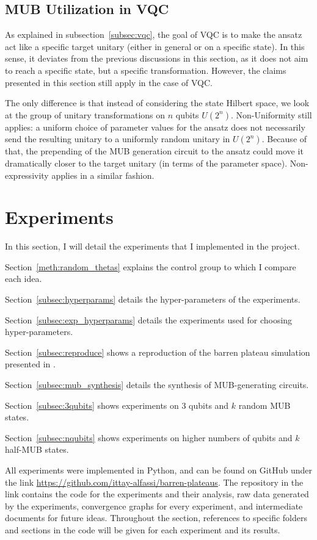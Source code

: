\documentclass[a4paper,12pt]{article}
\begin{document}
\subsection{MUB Utilization in VQC} \label{subsec:mub_vqc}
As explained in subsection~\ref{subsec:vqc}, the goal of VQC is to make the ansatz act like a specific target unitary (either in general or on a specific state).
In this sense, it deviates from the previous discussions in this section, as it does not aim to reach a specific state, but a specific transformation.
However, the claims presented in this section still apply in the case of VQC.

The only difference is that instead of considering the state Hilbert space, we look at the group of unitary transformations on $n$ qubits $U(2^n)$.
Non-Uniformity still applies: a uniform choice of parameter values for the ansatz does not necessarily send the resulting unitary to a uniformly random unitary in $U(2^n)$.
Because of that, the prepending of the MUB generation circuit to the ansatz could move it dramatically closer to the target unitary (in terms of the parameter space).
Non-expressivity applies in a similar fashion.

\section{Experiments} \label{sec:experiments}
In this section, I will detail the experiments that I implemented in the project.

Section~\ref{meth:random_thetas} explains the control group to which I compare each idea.

Section~\ref{subsec:hyperparams} details the hyper-parameters of the experiments.

Section~\ref{subsec:exp_hyperparams} details the experiments used for choosing hyper-parameters.

Section~\ref{subsec:reproduce} shows a reproduction of the barren plateau simulation presented in \cite{arrasmith_effect_2021}.

Section~\ref{subsec:mub_synthesis} details the synthesis of MUB-generating circuits.

Section~\ref{subsec:3qubits} shows experiments on 3 qubits and $k$ random MUB states.

Section~\ref{subsec:nqubits} shows experiments on higher numbers of qubits and $k$ half-MUB states.

All experiments were implemented in Python, and can be found on GitHub under the link \url{https://github.com/ittay-alfassi/barren-plateaus}.
The repository in the link contains the code for the experiments and their analysis, raw data generated by the experiments, convergence graphs for every experiment, and intermediate documents for future ideas.
Throughout the section, references to specific folders and sections in the code will be given for each experiment and its results.
\end{document}
